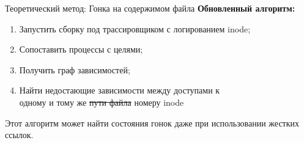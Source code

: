     \begin{frame}{Теоретический метод: Гонка на содержимом файла}
        \textbf{Обновленный алгоритм:}

        \begin{enumerate}
            \item Запустить сборку под трассировщиком с логированием inode;
            \item Сопоставить процессы с целями;
            \item Получить граф зависимостей;
            \item Найти недостающие зависимости между доступами к \\ одному и тому же \colorbox{diffrem}{\sout{\vphantom{fp}пути файла}}
            \colorbox{diffadd}{\vphantom{fp}номеру inode}
        \end{enumerate}

        Этот алгоритм может найти состояния гонок даже при использовании жестких ссылок.

    \end{frame}


